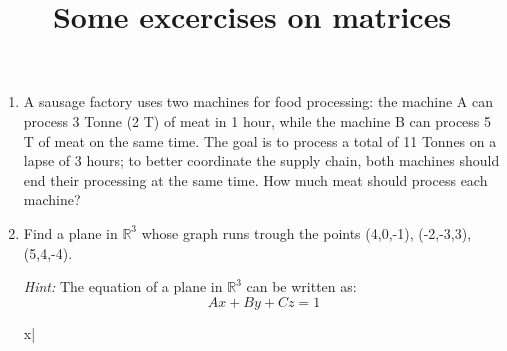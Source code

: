 \documentclass[10pt,letterpaper]{article}
\title{Some excercises on matrices}
\author{}
\date{}
\begin{document}
\begin{enumerate}
\item A sausage factory uses two machines for food processing:
the machine A can process 3 Tonne (2 T) of meat in 1 hour, while the machine B can process 5 T of meat on the same time.
The goal is to process a total of 11 Tonnes on a lapse of 3 hours; to better coordinate the supply chain, both machines should end their processing at the same time.
How much meat should process each machine?


\item Find a plane in $\mathbb{R}^3$ whose graph runs trough the points (4,0,-1), (-2,-3,3), (5,4,-4).

\textit{Hint:} The equation of a plane in $\mathbb{R}^3$ can be written as:
\begin{equation*}
A x + B y + Cz = 1
\end{equation*}

x|
\end{enumerate}
\end{document}
